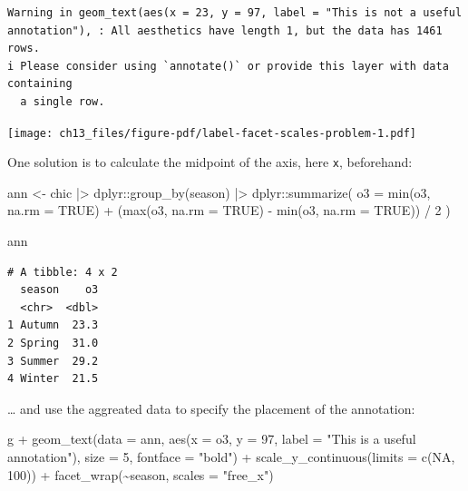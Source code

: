 \documentclass[
  letterpaper,
]{scrbook}
\newenvironment{Shaded}{\begin{snugshade}}{\end{snugshade}}
\newcommand{\AttributeTok}[1]{\textcolor[rgb]{0.40,0.45,0.13}{#1}}
\newcommand{\ConstantTok}[1]{\textcolor[rgb]{0.56,0.35,0.01}{#1}}
\newcommand{\DecValTok}[1]{\textcolor[rgb]{0.68,0.00,0.00}{#1}}
\newcommand{\FunctionTok}[1]{\textcolor[rgb]{0.28,0.35,0.67}{#1}}
\newcommand{\NormalTok}[1]{\textcolor[rgb]{0.00,0.23,0.31}{#1}}
\newcommand{\OtherTok}[1]{\textcolor[rgb]{0.00,0.23,0.31}{#1}}
\newcommand{\SpecialCharTok}[1]{\textcolor[rgb]{0.37,0.37,0.37}{#1}}
\newcommand{\StringTok}[1]{\textcolor[rgb]{0.13,0.47,0.30}{#1}}
\begin{document}
\begin{verbatim}
Warning in geom_text(aes(x = 23, y = 97, label = "This is not a useful annotation"), : All aesthetics have length 1, but the data has 1461 rows.
i Please consider using `annotate()` or provide this layer with data containing
  a single row.
\end{verbatim}

\texttt{[image: ch13\_files/figure-pdf/label-facet-scales-problem-1.pdf]}

One solution is to calculate the midpoint of the axis, here \texttt{x},
beforehand:

\begin{Shaded}
\begin{Highlighting}[]
\NormalTok{ann }\OtherTok{\textless{}{-}}
\NormalTok{  chic }\SpecialCharTok{|\textgreater{}}
\NormalTok{  dplyr}\SpecialCharTok{::}\FunctionTok{group\_by}\NormalTok{(season) }\SpecialCharTok{|\textgreater{}}
\NormalTok{  dplyr}\SpecialCharTok{::}\FunctionTok{summarize}\NormalTok{(}
    \AttributeTok{o3 =} \FunctionTok{min}\NormalTok{(o3, }\AttributeTok{na.rm =} \ConstantTok{TRUE}\NormalTok{) }\SpecialCharTok{+}
\NormalTok{          (}\FunctionTok{max}\NormalTok{(o3, }\AttributeTok{na.rm =} \ConstantTok{TRUE}\NormalTok{) }\SpecialCharTok{{-}} \FunctionTok{min}\NormalTok{(o3, }\AttributeTok{na.rm =} \ConstantTok{TRUE}\NormalTok{)) }\SpecialCharTok{/} \DecValTok{2}
\NormalTok{)}

\NormalTok{ann}
\end{Highlighting}
\end{Shaded}

\begin{verbatim}
# A tibble: 4 x 2
  season    o3
  <chr>  <dbl>
1 Autumn  23.3
2 Spring  31.0
3 Summer  29.2
4 Winter  21.5
\end{verbatim}

\ldots{} and use the aggreated data to specify the placement of the
annotation:

\begin{Shaded}
\begin{Highlighting}[]
\NormalTok{g }\SpecialCharTok{+}
  \FunctionTok{geom\_text}\NormalTok{(}\AttributeTok{data =}\NormalTok{ ann,}
            \FunctionTok{aes}\NormalTok{(}\AttributeTok{x =}\NormalTok{ o3, }\AttributeTok{y =} \DecValTok{97}\NormalTok{,}
                \AttributeTok{label =} \StringTok{"This is a useful annotation"}\NormalTok{),}
            \AttributeTok{size =} \DecValTok{5}\NormalTok{, }\AttributeTok{fontface =} \StringTok{"bold"}\NormalTok{) }\SpecialCharTok{+}
  \FunctionTok{scale\_y\_continuous}\NormalTok{(}\AttributeTok{limits =} \FunctionTok{c}\NormalTok{(}\ConstantTok{NA}\NormalTok{, }\DecValTok{100}\NormalTok{)) }\SpecialCharTok{+}
  \FunctionTok{facet\_wrap}\NormalTok{(}\SpecialCharTok{\textasciitilde{}}\NormalTok{season, }\AttributeTok{scales =} \StringTok{"free\_x"}\NormalTok{)}
\end{Highlighting}
\end{Shaded}
\end{document}
